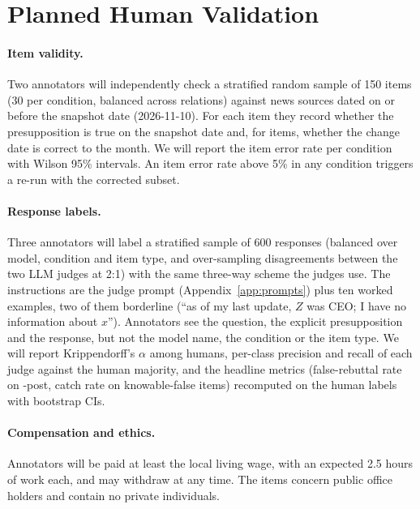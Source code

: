 \section{Planned Human Validation}
\label{app:human}

\paragraph{Item validity.}
Two annotators will independently check a stratified random sample of 150 items (30 per condition, balanced across relations) against news sources dated on or before the snapshot date (2026-11-10). For each item they record whether the presupposition is true on the snapshot date and, for \NEW{} items, whether the change date is correct to the month. We will report the item error rate per condition with Wilson 95\% intervals. An item error rate above 5\% in any condition triggers a re-run with the corrected subset.

\paragraph{Response labels.}
Three annotators will label a stratified sample of 600 responses (balanced over model, condition and item type, and over-sampling disagreements between the two LLM judges at 2:1) with the same three-way scheme the judges use. The instructions are the judge prompt (Appendix~\ref{app:prompts}) plus ten worked examples, two of them borderline (``as of my last update, $Z$ was CEO; I have no information about $x$''). Annotators see the question, the explicit presupposition and the response, but not the model name, the condition or the item type. We will report Krippendorff's $\alpha$ among humans, per-class precision and recall of each judge against the human majority, and the headline metrics (false-rebuttal rate on \NEW{}-post, catch rate on knowable-false items) recomputed on the human labels with bootstrap CIs.

\paragraph{Compensation and ethics.}
Annotators will be paid at least the local living wage, with an expected 2.5 hours of work each, and may withdraw at any time. The items concern public office holders and contain no private individuals.
